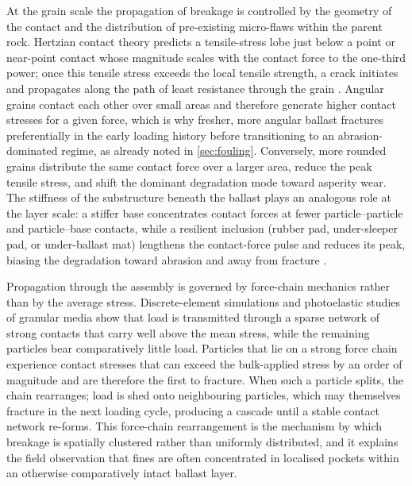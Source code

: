 At the grain scale the propagation of breakage is controlled by the geometry of the contact and the distribution of pre-existing micro-flaws within the parent rock. Hertzian contact theory predicts a tensile-stress lobe just below a point or near-point contact whose magnitude scales with the contact force to the one-third power; once this tensile stress exceeds the local tensile strength, a crack initiates and propagates along the path of least resistance through the grain \citep{lim2005}. Angular grains contact each other over small areas and therefore generate higher contact stresses for a given force, which is why fresher, more angular ballast fractures preferentially in the early loading history before transitioning to an abrasion-dominated regime, as already noted in \cref{sec:fouling}. Conversely, more rounded grains distribute the same contact force over a larger area, reduce the peak tensile stress, and shift the dominant degradation mode toward asperity wear. The stiffness of the substructure beneath the ballast plays an analogous role at the layer scale: a stiffer base concentrates contact forces at fewer particle--particle and particle--base contacts, while a resilient inclusion (rubber pad, under-sleeper pad, or under-ballast mat) lengthens the contact-force pulse and reduces its peak, biasing the degradation toward abrasion and away from fracture \citep{solsanchez2015,navaratnarajah2017}.

Propagation through the assembly is governed by force-chain mechanics rather than by the average stress. Discrete-element simulations and photoelastic studies of granular media \citep{cundall1979,tordesillas2007} show that load is transmitted through a sparse network of strong contacts that carry well above the mean stress, while the remaining particles bear comparatively little load. Particles that lie on a strong force chain experience contact stresses that can exceed the bulk-applied stress by an order of magnitude and are therefore the first to fracture. When such a particle splits, the chain rearranges; load is shed onto neighbouring particles, which may themselves fracture in the next loading cycle, producing a cascade until a stable contact network re-forms. This force-chain rearrangement is the mechanism by which breakage is spatially clustered rather than uniformly distributed, and it explains the field observation that fines are often concentrated in localised pockets within an otherwise comparatively intact ballast layer.

